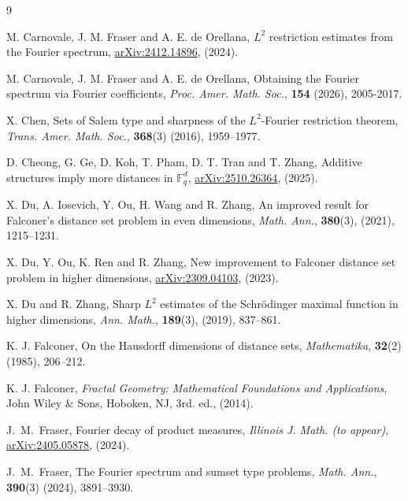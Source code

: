 \documentclass[11pt]{amsart}
\numberwithin{equation}{section}
\theoremstyle{plain}
\theoremstyle{remark}
\begin{document}
\begin{thebibliography}{9}


M. Carnovale, J. M. Fraser and  A. E. de Orellana, $L^2$ restriction estimates from the Fourier spectrum,  
\href{https://arxiv.org/abs/2412.14896}{arXiv:2412.14896}, (2024).

M. Carnovale, J. M. Fraser and  A. E. de Orellana, Obtaining the Fourier spectrum via Fourier coefficients, \textit{Proc. Amer. Math. Soc.}, \textbf{154} (2026), 2005-2017.



X. Chen, Sets of Salem type and sharpness of the $L^2$-Fourier restriction theorem, \textit{Trans. Amer. Math. Soc.}, \textbf{368}(3) (2016), 1959--1977.

D. Cheong, G. Ge, D. Koh, T. Pham, D. T. Tran and T. Zhang, Additive structures imply more distances in $\mathbb {F} _q^ d$, \href{https://arxiv.org/abs/2510.26364}{arXiv:2510.26364}, (2025).

X. Du, A. Iosevich, Y. Ou, H. Wang and R. Zhang, An improved result for Falconer’s
distance set problem in even dimensions, \emph{Math. Ann.}, {\bf 380}(3), (2021), 1215--1231.


X. Du, Y. Ou, K. Ren and R. Zhang,
New improvement to Falconer distance set problem in higher dimensions, \href{https://arxiv.org/abs/2309.04103}{arXiv:2309.04103}, (2023).

X. Du and R. Zhang, Sharp $L^2$ estimates of the Schrödinger maximal function in
higher dimensions, \emph{Ann. Math.}, \textbf{189}(3), (2019), 837–861.

K. J. Falconer, On the Hausdorff dimensions of distance sets, \emph{Mathematika}, {\bf 32}(2) (1985), 206--212.

K. J. Falconer,
{\em Fractal Geometry: Mathematical Foundations and Applications},
 John Wiley \& Sons, Hoboken, NJ, 3rd. ed., (2014).

J.~M.~Fraser, Fourier decay of product measures, \emph{Illinois J. Math. (to appear)}, 
\href{https://arxiv.org/abs/2405.05878}{arXiv:2405.05878}, (2024).

J.~M.~Fraser, The Fourier spectrum and sumset type problems, \emph{Math. Ann.}, \textbf{390}(3) (2024), 3891--3930.




\end{thebibliography}
\end{document}
